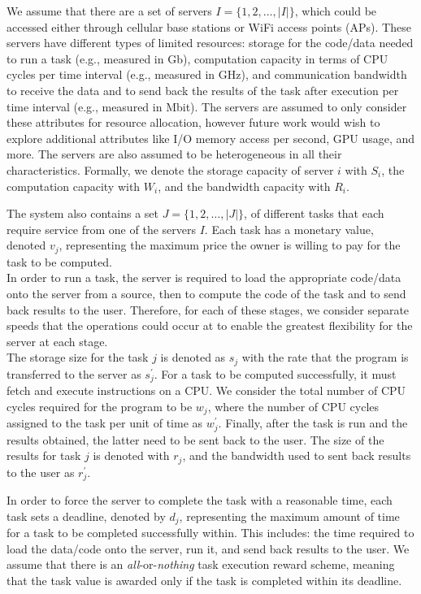 We assume that there are a set of servers $I = \{1,2,\ldots,\left|I\right|\}$, which could be accessed either through
cellular base stations or WiFi access points (APs). These servers have different types of limited resources:
storage for the code/data needed to run a task (e.g., measured in Gb), computation capacity in terms of CPU cycles per
time interval (e.g., measured in GHz), and communication bandwidth to receive the data and to send back the results
of the task after execution per time interval (e.g., measured in Mbit). The servers are assumed to only consider these
attributes for resource allocation, however future work would wish to explore additional attributes like I/O memory
access per second, GPU usage, and more. The servers are also assumed to be heterogeneous in all their characteristics.
Formally, we denote the storage capacity of server $i$ with $S_i$, the computation capacity with $W_i$, and the
bandwidth capacity with $R_i$.

The system also contains a set $J = \{1,2,\ldots,\left| J \right|\}$, of different tasks that each require service from
one of the servers $I$. Each task has a monetary value, denoted $v_j$, representing the maximum price the owner is
willing to pay for the task to be computed. \\
In order to run a task, the server is required to load the appropriate code/data onto the server from a source, then to
compute the code of the task and to send back results to the user. Therefore, for each of these stages, we consider
separate speeds that the operations could occur at to enable the greatest flexibility for the server at each stage. \\
The storage size for the task $j$ is denoted as $s_j$ with the rate that the program is transferred to the server
as $s^{'}_j$. For a task to be computed successfully, it must fetch and execute instructions on a CPU. We consider the
total number of CPU cycles required for the program to be $w_j$, where the number of CPU cycles assigned to the task
per unit of time as $w^{'}_j$. Finally, after the task is run and the results obtained, the latter need to be sent back
to the user. The size of the results for task $j$ is denoted with $r_j$, and the bandwidth used to sent back results to
the user as $r^{'}_j$.

In order to force the server to complete the task with a reasonable time, each task sets a deadline, denoted by $d_j$,
representing the maximum amount of time for a task to be completed successfully within. This includes: the time
required to load the data/code onto the server, run it, and send back results to the user. We assume that there
is an \emph{all}-or-\emph{nothing} task execution reward scheme, meaning that the task value is awarded only if the
task is completed within its deadline.

